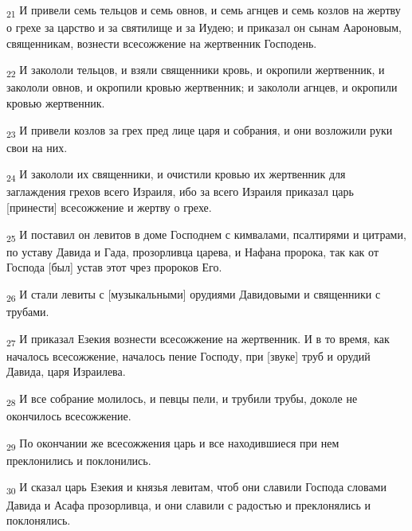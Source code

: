 \begin{tcolorbox}
\textsubscript{21} И привели семь тельцов и семь овнов, и семь агнцев и семь козлов на жертву о грехе за царство и за святилище и за Иудею; и приказал он сынам Аароновым, священникам, вознести всесожжение на жертвенник Господень.
\end{tcolorbox}
\begin{tcolorbox}
\textsubscript{22} И закололи тельцов, и взяли священники кровь, и окропили жертвенник, и закололи овнов, и окропили кровью жертвенник; и закололи агнцев, и окропили кровью жертвенник.
\end{tcolorbox}
\begin{tcolorbox}
\textsubscript{23} И привели козлов за грех пред лице царя и собрания, и они возложили руки свои на них.
\end{tcolorbox}
\begin{tcolorbox}
\textsubscript{24} И закололи их священники, и очистили кровью их жертвенник для заглаждения грехов всего Израиля, ибо за всего Израиля приказал царь [принести] всесожжение и жертву о грехе.
\end{tcolorbox}
\begin{tcolorbox}
\textsubscript{25} И поставил он левитов в доме Господнем с кимвалами, псалтирями и цитрами, по уставу Давида и Гада, прозорливца царева, и Нафана пророка, так как от Господа [был] устав этот чрез пророков Его.
\end{tcolorbox}
\begin{tcolorbox}
\textsubscript{26} И стали левиты с [музыкальными] орудиями Давидовыми и священники с трубами.
\end{tcolorbox}
\begin{tcolorbox}
\textsubscript{27} И приказал Езекия вознести всесожжение на жертвенник. И в то время, как началось всесожжение, началось пение Господу, при [звуке] труб и орудий Давида, царя Израилева.
\end{tcolorbox}
\begin{tcolorbox}
\textsubscript{28} И все собрание молилось, и певцы пели, и трубили трубы, доколе не окончилось всесожжение.
\end{tcolorbox}
\begin{tcolorbox}
\textsubscript{29} По окончании же всесожжения царь и все находившиеся при нем преклонились и поклонились.
\end{tcolorbox}
\begin{tcolorbox}
\textsubscript{30} И сказал царь Езекия и князья левитам, чтоб они славили Господа словами Давида и Асафа прозорливца, и они славили с радостью и преклонялись и поклонялись.
\end{tcolorbox}
